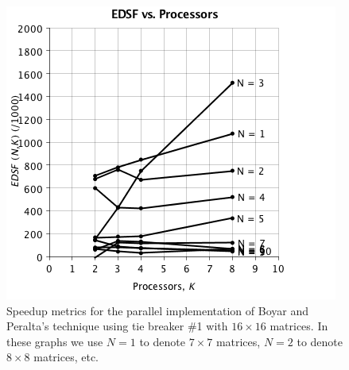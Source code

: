 \begin{figure}
\begin{center}
\includegraphics[scale=0.35]{./chapter_optimize/t1u_speed_1.png}
\caption{Speedup metrics for the parallel implementation of Boyar and Peralta's technique using tie breaker \#1 with $16 \times 16$ matrices. In these graphs we use $N = 1$ to denote $7 \times 7$ matrices, $N = 2$ to denote $8 \times 8$ matrices, etc.}
\label{fig:speedup1}
\end{center}


\end{figure}
